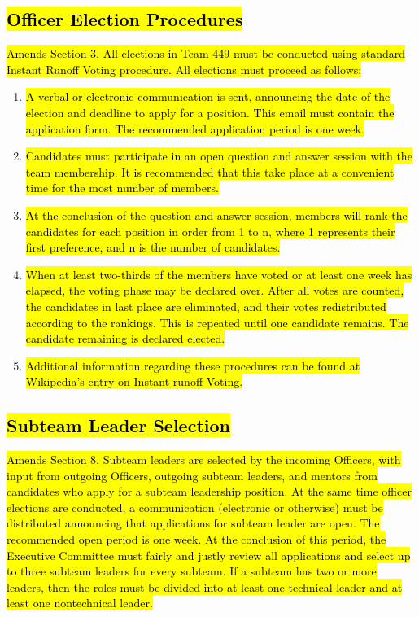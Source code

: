 \documentclass[12pt, a4paper]{article}
\begin{document}
\subsection{\hl{Officer Election Procedures}}
\hl{Amends Section 3. 
All elections in Team 449 must be conducted using standard Instant Runoff Voting procedure. All elections must proceed as follows:}
\begin{enumerate}
\item \hl{A verbal or electronic communication is sent, announcing the date of the election and deadline to apply for a position. This email must contain the application form. The recommended application period is one week.}
\item \hl{Candidates must participate in an open question and answer session with the team membership. It is recommended that this take place at a convenient time for the most number of members.}
\item \hl{At the conclusion of the question and answer session, members will rank the candidates for each position in order from 1 to n, where 1 represents their first preference, and n is the number of candidates. }
\item \hl{When at least two-thirds of the members have voted or at least one week has elapsed, the voting phase may be declared over. After all votes are counted, the candidates in last place are eliminated, and their votes redistributed according to the rankings. This is repeated until one candidate remains. The candidate remaining is declared elected.}
\item \hl{Additional information regarding these procedures can be found at Wikipedia's entry on Instant-runoff Voting.}
\end{enumerate}

\subsection{\hl{Subteam Leader Selection}}
\hl{Amends Section 8. Subteam leaders are selected by the incoming Officers, with input from outgoing Officers, outgoing subteam leaders, and mentors from candidates who apply for a subteam leadership position. 
At the same time officer elections are conducted, a communication (electronic or otherwise) must be distributed announcing that applications for subteam leader are open. 
The recommended open period is one week. 
At the conclusion of this period, the Executive Committee must fairly and justly review all applications and select up to three subteam leaders for every subteam. 
If a subteam has two or more leaders, then the roles must be divided into at least one technical leader and at least one nontechnical leader.}
\end{document}
